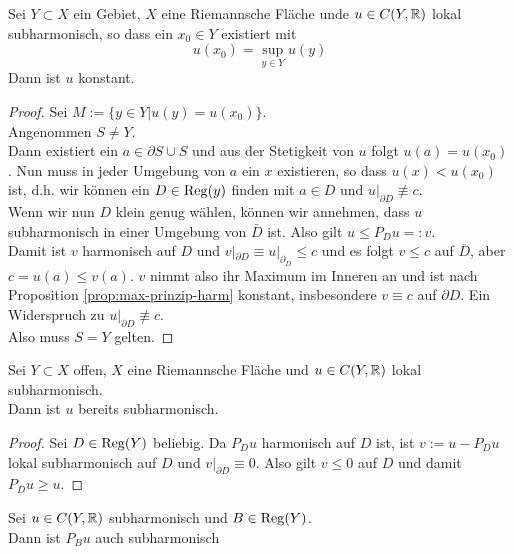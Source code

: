 \begin{thm}
  Sei $Y \subset X$ ein Gebiet, $X$ eine Riemannsche Fläche unde $u
  \in C(Y, \mathbb{R})$ lokal subharmonisch, so dass ein $x_0 \in Y$ existiert
  mit
  \[
  u(x_0) = \sup_{y\in Y} u(y)
  \]
  Dann ist $u$ konstant.
\end{thm}

\begin{proof}
  Sei $M:= \{y \in Y | u(y) = u(x_0) \}$. \\
  Angenommen $S \neq Y$. \\
  Dann existiert ein $a \in \partial S \cup S$ und aus der Stetigkeit
  von $u$ folgt $u(a) = u(x_0)$. Nun muss in jeder Umgebung von $a$
  ein $x$ existieren, so dass $u(x) < u(x_0)$ ist, d.h. wir können ein
  $D \in \operatorname{Reg}(y)$ finden mit $a \in D$ und $u|_{\partial D} \not
  \equiv c$. \\
  Wenn wir nun $D$ klein genug wählen, können wir annehmen, dass $u$
  subharmonisch in einer Umgebung von $\bar D$ ist. Also gilt $u \leq
  P_D u =: v$. \\
  Damit ist $v$ harmonisch auf $D$ und $v|_{\partial D} \equiv
  u|_{\partial_D} \leq c$ und es folgt $v \leq c$ auf $\bar D$, aber
  $c = u(a) \leq v(a)$. $v$ nimmt also ihr Maximum im Inneren an und
  ist nach Proposition \ref{prop:max-prinzip-harm} konstant,
  insbesondere $v \equiv c$ auf $\partial D$. Ein Widerspruch zu
  $u|_{\partial D} \not \equiv c$. \\
  Also muss $S = Y$ gelten.
\end{proof}

\begin{cor}
  Sei $Y\subset X$ offen, $X$ eine Riemannsche Fläche und $u \in C(Y,
  \mathbb{R})$ lokal subharmonisch. \\
  Dann ist $u$ bereits subharmonisch.
\end{cor}

\begin{proof}
  Sei $D \in \operatorname{Reg}(Y)$ beliebig. Da $P_D u$ harmonisch auf $D$ ist, ist
  $v:= u- P_Du$ lokal subharmonisch auf $D$ und $v|_{\partial D}
  \equiv 0$. Also gilt $v \leq0$ auf $D$ und damit $P_Du \geq u$.
\end{proof}

\begin{lemma}
  Sei $u \in C(Y, \mathbb{R})$ subharmonisch und $B \in \operatorname{Reg}(Y)$.\\
  Dann ist $P_B u$ auch subharmonisch
\end{lemma}


